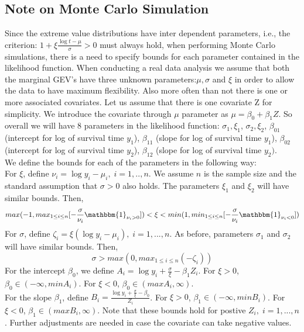 \documentclass[11pt]{article}
\theoremstyle{remboldstyle}
\begin{document}
\subsection{Note on Monte Carlo Simulation}
\label{sec:note1}
\noindent
Since the extreme value distributions have inter dependent parameters, i.e., the criterion: $1 + \xi \frac{\log t - \mu}{\sigma} > 0$ must always hold, when performing Monte Carlo simulations, there is a need to specify bounds for each parameter contained in the likelihood function. When conducting a real data analysis we assume that both the marginal GEV's have three unknown parameters:$\mu, \sigma$ and $\xi$ in order to allow the data to have maximum flexibility. Also more often than not there is one or more associated covariates. Let us assume that there is one covariate Z for simplicity. We introduce the covariate through $\mu$ parameter as $\mu = \beta_0 + \beta_1Z$. So overall we will have 8 parameters in the likelihood function: $\sigma_1, \xi_1$, $\sigma_2, \xi_2$, $\beta_{01}$ (intercept for log of survival time $y_1$), $\beta_{11}$ (slope for log of survival time $y_1$), $\beta_{02}$ (intercept for log of survival time $y_2$), $\beta_{12}$ (slope for log of survival time $y_2)$.\\
We define the bounds for each of the parameters in the following way:\\
For $\xi$, define $\nu_i = \log y_i - \mu_i, \; i = 1,.., n$. We assume $n$ is the sample size and the standard assumption that $\sigma > 0$ also holds. The parameters $\xi_1$ and $\xi_2$ will have similar bounds. Then,
\[
max(-1, max_{1 \le i \le n}[-\frac{\sigma}{\nu_i}\mathbbm{1}_{\nu_i > 0}]) < \xi < min(1, min_{1 \le i \le n}[-\frac{\sigma}{\nu_i}\mathbbm{1}_{\nu_i < 0}])
\]
For $\sigma$, define $\zeta_i = \xi (\log y_i - \mu_i), \; i = 1,..., n$. As before, parameters $\sigma_1$ and $\sigma_2$ will have similar bounds. Then,
\[
\sigma > max( 0, max_{1 \le i \le n}(-\zeta_i))
\]
For the intercept $\beta_0$, we define $A_i = \log y_i + \frac{\sigma}{\xi} - \beta_1 Z_i$. For $\xi > 0$, $\beta_0 \in (-\infty, min A_i)$. For $\xi < 0$, $\beta_0 \in (max A_i, \infty)$.\\
For the slope $\beta_1$, define $B_i = \frac{\log y_i + \frac{\sigma}{\xi} - \beta_0 }{Z_i}$. For $\xi > 0$, $\beta_1 \in (-\infty, min B_i)$. For $\xi < 0$, $\beta_1 \in (max B_i, \infty)$. Note that these bounds hold for postive $Z_i, \; i = 1,...,n$. Further adjustments are needed in case the covariate can take negative values. 
\end{document}
